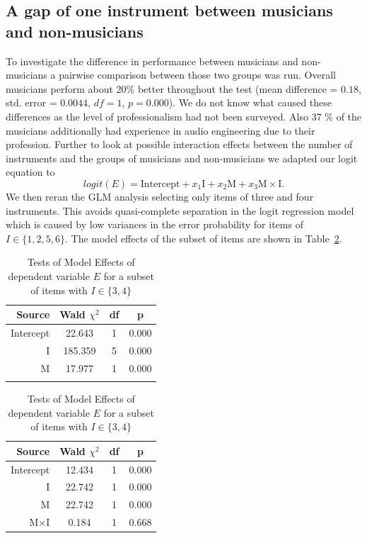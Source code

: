 \subsection{A gap of one instrument between musicians and non-musicians}
To investigate the difference in performance between musicians and non-musicians a pairwise comparison between those two groups was run. Overall musicians perform about 20\% better throughout the test (mean difference = $0.18$, std. error = $ 0.0044$, $df = 1$, $p=0.000$). We do not know what caused these differences as the level of professionalism had not been surveyed. Also 37 \% of the musicians additionally had experience in audio engineering due to their profession. Further to look at possible interaction effects between the number of instruments and the groups of musicians and non-musicians we adapted our logit equation to
\begin{equation}
	logit(E) =  \text{Intercept} + x_1 \text{I} + x_2 \text{M} + x_3 \text{M}\times\text{I} .
	\label{eq:logit_interactions}
\end{equation}
We then reran the GLM analysis selecting only items of three and four instruments. This avoids quasi-complete separation in the logit regression model which is caused by low variances in the error probability for items of $I \in \{1,2,5,6\}$. The model effects of the subset of items are shown in Table~\ref{tab:glm_logit_34}.
\begin{table}
\center
\scriptsize
\begin{minipage}[b]{0.45\textwidth}\centering
	\begin{tabular}{rccc}
	\toprule[1.5pt]
	Source    & Wald $\chi^2$ & df & p \\
	\midrule
	Intercept & 22.643 & 1 & 0.000 \\
	I & 185.359	& 5 & 0.000 \\
	M & 17.977 & 1 & 0.000 \\
	& & & \\
	\bottomrule[1.5pt]
	\end{tabular}
	\caption{Tests of Model Effects of dependent variable $E$ }
    \label{tab:glm_logit}
\end{minipage}
\hfill
\begin{minipage}[b]{0.45\textwidth}
	\begin{tabular}{rccc}
	\toprule[1.5pt]
	Source    & Wald $\chi^2$ & df & p \\
	\midrule
	Intercept & 12.434 & 1 & 0.000 \\
	I & 22.742	& 1 & 0.000 \\
	M & 22.742 & 1 & 0.000 \\
	M$\times$I	& 0.184 & 1 & 0.668 \\
	\bottomrule[1.5pt]
	\end{tabular}
	\caption{Tests of Model Effects of dependent variable $E$ for a subset of items with $I \in \{3,4\}$}
    \label{tab:glm_logit_34}
\end{minipage}
\end{table}

